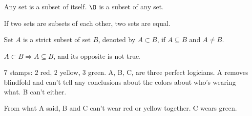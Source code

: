 \begin{theorem}
Any set is a subset of itself. $\O$ is a subset of any set. 
\end{theorem}

If two sets are subsets of each other, two sets are equal.

\begin{defn}
Set $A$ is a strict subset of set $B$, denoted by $A \subset B$, if $A \subseteq B$ and $A \neq B$. 
\end{defn}

$A \subset B \Rightarrow A \subseteq B$, and its opposite is not true.

\begin{ex}
7 stamps: 2 red, 2 yellow, 3 green. A, B, C, are three perfect logicians. A removes blindfold and can't tell any conclusions about the colors about who's wearing what. B can't either.

From what A said, B and C can't wear red or yellow together. C wears green.
\end{ex}

